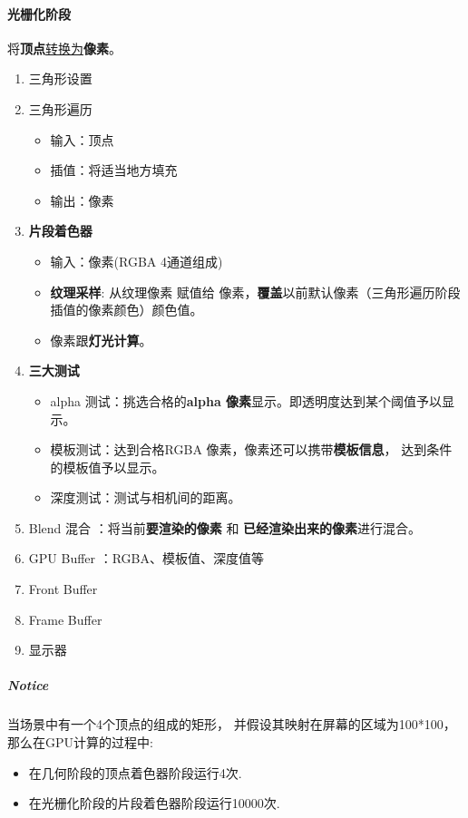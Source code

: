 \documentclass[UTF8,a4paper,12pt]{ctexbook}
\begin{document}
		\paragraph{光栅化阶段}
			将\textbf{顶点}\underline{转换为}\textbf{像素}。
			
			\begin{enumerate}
				\item 三角形设置
				\item 三角形遍历
					\begin{itemize}
						\item 输入：顶点
						\item 插值：将适当地方填充
						\item 输出：像素
					\end{itemize}
				\item \textbf{片段着色器}
					\begin{itemize}
						\item 输入：像素(RGBA 4通道组成)
						\item \textbf{纹理采样}: 从纹理像素 赋值给 像素，\textbf{覆盖}以前默认像素（三角形遍历阶段插值的像素颜色）颜色值。
						\item 像素跟\textbf{灯光计算}。
					\end{itemize}					
				\item \textbf{三大测试}
					\begin{itemize}
						\item alpha 测试：挑选合格的\textbf{alpha 像素}显示。即透明度达到某个阈值予以显示。
						\item 模板测试：达到合格RGBA 像素，像素还可以携带\textbf{模板信息}， 达到条件的模板值予以显示。
						\item 深度测试：测试与相机间的距离。
					\end{itemize}
				\item Blend 混合 ：将当前\textbf{要渲染的像素} 和 \textbf{已经渲染出来的像素}进行混合。
				\item GPU Buffer ：RGBA、模板值、深度值等
				\item Front Buffer 
				\item Frame Buffer
				\item 显示器
			\end{enumerate}
	
	
			\subparagraph{Notice}
				当场景中有一个4个顶点的组成的矩形， 并假设其映射在屏幕的区域为100*100，那么在GPU计算的过程中:
				\begin{itemize}
					\item 在几何阶段的顶点着色器阶段运行4次.
					\item 在光栅化阶段的片段着色器阶段运行10000次.	
				\end{itemize}
				
\end{document}
